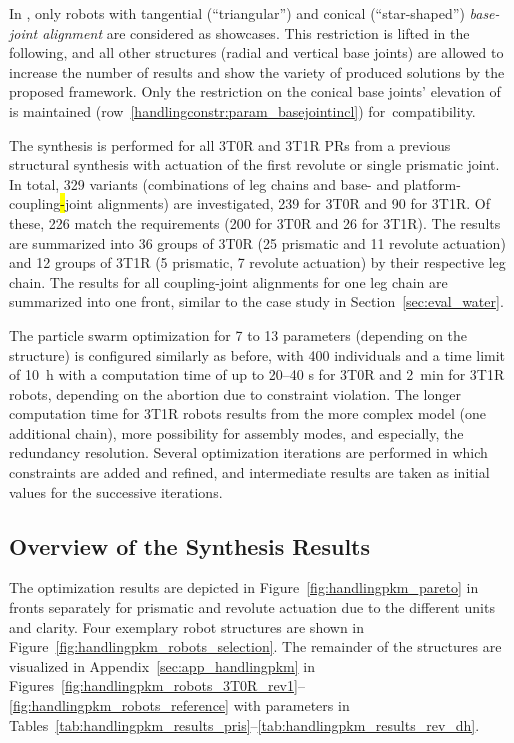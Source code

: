 In \cite{PrauseChaCor2015}, only robots with tangential (``triangular'') and conical (``star-shaped'') \emph{base-joint alignment} are considered as showcases.
This restriction is lifted in the following, and all other structures (radial and vertical base joints) are allowed to increase the number of results and show the variety of produced solutions by the proposed framework.
Only the restriction on the conical base joints' elevation of \cite{PrauseChaCor2015} is maintained (row~\ref{handlingconstr:param_basejointincl}) for~compatibility.


The synthesis is performed for all 3T0R and 3T1R PRs from a previous structural synthesis {with actuation} of the first revolute or single prismatic joint.
In total, 329 variants (combinations of leg chains and base- and platform-coupling\hl{-}joint alignments) are investigated, 239 for 3T0R and 90 for 3T1R.
Of these, 226 match the requirements (200 for 3T0R and 26 for 3T1R).
The results are summarized into 36 groups of 3T0R (25 prismatic and 11 revolute actuation) and 12 groups of 3T1R (5 prismatic, 7 revolute actuation) by their respective leg chain.
The results for all coupling-joint alignments for one leg chain are summarized into one  front, similar to the case study in Section~\ref{sec:eval_water}.

The particle swarm optimization for 7 to 13 parameters (depending on the structure) is configured similarly as before, with 400 individuals and a time limit of \SI{10}{\hour} with a computation time of up to 20--40 s for 3T0R and \SI{2}{\minute} for 3T1R robots, depending on the abortion due to constraint violation.
The longer computation time for 3T1R robots results from the more complex model (one additional chain), more possibility for assembly modes, and especially, the redundancy resolution.
Several optimization iterations are performed in which constraints are added and refined, and intermediate results are taken as initial values for the successive iterations.

\subsection{Overview of the Synthesis Results}
\label{sec:eval_handling_results}

%
%
%
%
%
%


The optimization results are depicted in Figure~\ref{fig:handlingpkm_pareto} in  fronts separately for prismatic and revolute actuation due to the different units and clarity.
Four exemplary robot structures are shown in Figure~\ref{fig:handlingpkm_robots_selection}.
The remainder of the structures are visualized in Appendix~\ref{sec:app_handlingpkm} in Figures~\ref{fig:handlingpkm_robots_3T0R_rev1}--\ref{fig:handlingpkm_robots_reference} with parameters in Tables~\ref{tab:handlingpkm_results_pris}--\ref{tab:handlingpkm_results_rev_dh}.


